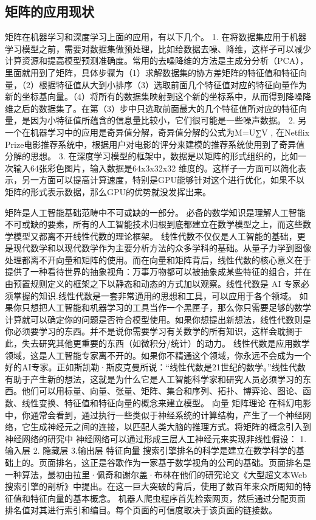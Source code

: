 \subsection{矩阵的应用现状}
矩阵在机器学习和深度学习上面的应用，有以下几个。
1.	在将数据集应用于机器学习模型之前，需要对数据集做预处理，比如给数据去噪、降维，这样子可以减少计算资源和提高模型预测准确度。常用的去噪降维的方法是主成分分析（PCA），里面就用到了矩阵，具体步骤为（1）求解数据集的协方差矩阵的特征值和特征向量，（2）根据特征值从大到小排序（3）选取前面几个特征值对应的特征向量作为新的坐标基向量。（4）将所有的数据集映射到这个新的坐标系中，从而得到降噪降维之后的数据集了。在第（3）步中只选取前面最大的几个特征值所对应的特征向量，是因为小特征值所蕴含的信息量比较小，它们很可能是一些噪声数据。
2.	另一个在机器学习中的应用是奇异值分解，奇异值分解的公式为M=U∑V  , 在Netflix Prize电影推荐系统中，根据用户对电影的评分来建模的推荐系统使用到了奇异值分解的思想。
3. 在深度学习模型的框架中，数据是以矩阵的形式组织的，比如一次输入64张彩色图片，输入数据是64x3x32x32 维度的。这样子一方面可以简化表示，另一方面可以提高计算速度，特别是GPU能够针对这个进行优化，如果不以矩阵的形式表示数据，那么GPU的优势就没发挥出来。

矩阵是人工智能基础范畴中不可或缺的一部分。
必备的数学知识是理解人工智能不可或缺的要素，所有的人工智能技术归根到底都建立在数学模型之上，而这些数学模型又都离不开线性代数的理论框架。
线性代数不仅仅是人工智能的基础，更是现代数学和以现代数学作为主要分析方法的众多学科的基础。从量子力学到图像处理都离不开向量和矩阵的使用。而在向量和矩阵背后，线性代数的核心意义在于提供了⼀种看待世界的抽象视角：万事万物都可以被抽象成某些特征的组合，并在由预置规则定义的框架之下以静态和动态的方式加以观察。线性代数是 AI 专家必须掌握的知识.线性代数是一套非常通用的思想和工具，可以应用于各个领域。
如果你只想把人工智能和机器学习的工具当作一个黑匣子，那么你只需要足够的数学计算就可以确定你的问题是否符合模型使用。如果你想提出新想法，线性代数则是你必须要学习的东西。并不是说你需要学习有关数学的所有知识，这样会耽搁于此，失去研究其他更重要的东西（如微积分/统计）的动力。
线性代数是应用数学领域，这是人工智能专家离不开的。如果你不精通这个领域，你永远不会成为一个好的AI专家。正如斯凯勒·斯皮克曼所说：“线性代数是21世纪的数学。”线性代数有助于产生新的想法，这就是为什么它是人工智能科学家和研究人员必须学习的东西。他们可以用标量、向量、张量、矩阵、集合和序列、拓扑、博弈论、图论、函数、线性变换、特征值和特征向量的概念来建立模型。
向量 矩阵理论
在科幻电影中，你通常会看到，通过执行一些类似于神经系统的计算结构，产生了一个神经网络，它生成神经元之间的连接，以匹配人类大脑的推理方式。将矩阵的概念引入到神经网络的研究中
神经网络可以通过形成三层人工神经元来实现非线性假设：
1. 输入层   2. 隐藏层   3.输出层
特征向量
搜索引擎排名的科学是建立在数学科学的基础上的。页面排名，这正是谷歌作为一家基于数学视角的公司的基础。页面排名是一种算法，最初由拉里·佩奇和谢尔盖·布林在他们的研究论文《大型超文本Web搜索引擎的剖析》中提出。在这一巨大突破的背后，使用了数百年来众所周知的特征值和特征向量的基本概念。
机器人爬虫程序首先检索网页，然后通过分配页面排名值对其进行索引和编目。每个页面的可信度取决于该页面的链接数。


